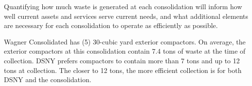 
    Quantifying how much waste is generated at each consolidation will inform how well current assets and services serve current needs, and what additional elements are necessary for each consolidation to operate as efficiently as possible.
    
    Wagner Consolidated has (5) 30-cubic yard exterior compactors. On average, the exterior compactors at this consolidation contain 7.4 tons of waste at the time of collection. DSNY prefers compactors to contain more than 7 tons and up to 12 tons at collection. The closer to 12 tons, the more efficient collection is for both DSNY and the consolidation.